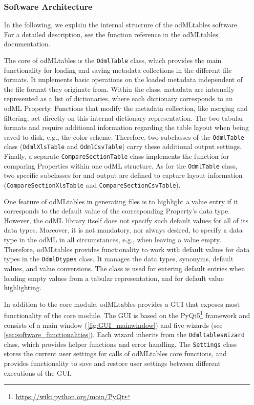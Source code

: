 \subsubsection{Software Architecture}
\label{sub:Software-Architecture}

In the following, we explain the internal structure of the odMLtables software. For a detailed description, see the function reference in the odMLtables documentation.

The core of odMLtables is the \texttt{OdmlTable} class, which provides the main functionality for loading and saving metadata collections in the different file formats. It implements basic operations on the loaded metadata independent of the file format they originate from. Within the class, metadata are internally represented as a list of dictionaries, where each dictionary corresponds to an odML Property. Functions that modify the metadata collection, like merging and filtering, act directly on this internal dictionary representation. The two tabular formats  and  require additional information regarding the table layout when being saved to disk, e.g., the color scheme. Therefore, two subclasses of the \texttt{OdmlTable} class (\texttt{OdmlXlsTable} and \texttt{OdmlCsvTable}) carry these additional output settings. Finally, a separate \texttt{CompareSectionTable} class implements the function for comparing Properties within one odML structure. As for the \texttt{OdmlTable} class, two specific subclasses for  and  output are defined to capture layout information (\texttt{CompareSectionXlsTable} and \texttt{CompareSectionCsvTable}).

One feature of odMLtables in generating  files is to highlight a value entry if it corresponds to the default value of the corresponding Property's data type. However, the odML library itself does not specify such default values for all of its data types. Moreover, it is not mandatory, nor always desired, to specify a data type in the odML in all circumstances, e.g., when leaving a value empty. Therefore, odMLtables provides functionality to work with default values for data types in the \texttt{OdmlDtypes} class. It manages the data types, synonyms, default values, and value conversions. The class is used for entering default entries when loading empty values from a tabular representation, and for default value highlighting.

In addition to the core module, odMLtables provides a GUI that exposes most functionality of the core module. The GUI is based on the PyQt5\footnote{\url{https://wiki.python.org/moin/PyQt}} framework and consists of a main window (\cref{fig:GUI_mainwindow}) and five wizards (see \cref{sec:software_functionalities}). Each wizard inherits from the \texttt{OdmltablesWizard} class, which provides helper functions and error handling. The \texttt{Settings} class stores the current user settings for calls of odMLtables core functions, and provides functionality to save and restore user settings between different executions of the GUI.


